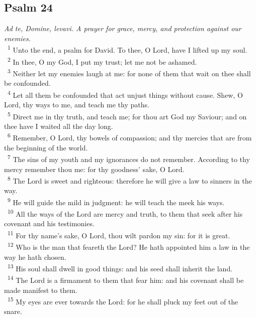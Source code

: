 \documentclass[a5paper,12pt]{article}
\begin{document}
\begin{multicols*}{2}
\section{Psalm 24}
\label{sec:org00402b8}
\emph{Ad te, Domine, levavi. A prayer for grace, mercy, and protection against our enemies.}\\

~\textsuperscript{1} Unto the end, a psalm for David. To thee, O Lord, have I lifted up my soul.\\
~\textsuperscript{2} In thee, O my God, I put my trust; let me not be ashamed.\\
~\textsuperscript{3} Neither let my enemies laugh at me: for none of them that wait on thee shall be confounded.\\
~\textsuperscript{4} Let all them be confounded that act unjust things without cause. Shew, O Lord, thy ways to me, and teach me thy paths.\\
~\textsuperscript{5} Direct me in thy truth, and teach me; for thou art God my Saviour; and on thee have I waited all the day long.\\
~\textsuperscript{6} Remember, O Lord, thy bowels of compassion; and thy mercies that are from the beginning of the world.\\
~\textsuperscript{7} The sins of my youth and my ignorances do not remember. According to thy mercy remember thou me: for thy goodness' sake, O Lord.\\
~\textsuperscript{8} The Lord is sweet and righteous: therefore he will give a law to sinners in the way.\\
~\textsuperscript{9} He will guide the mild in judgment: he will teach the meek his ways.\\
~\textsuperscript{10} All the ways of the Lord are mercy and truth, to them that seek after his covenant and his testimonies.\\
~\textsuperscript{11} For thy name's sake, O Lord, thou wilt pardon my sin: for it is great.\\
~\textsuperscript{12} Who is the man that feareth the Lord? He hath appointed him a law in the way he hath chosen.\\
~\textsuperscript{13} His soul shall dwell in good things: and his seed shall inherit the land.\\
~\textsuperscript{14} The Lord is a firmament to them that fear him: and his covenant shall be made manifest to them.\\
~\textsuperscript{15} My eyes are ever towards the Lord: for he shall pluck my feet out of the snare.\\

\end{multicols*}
\end{document}
